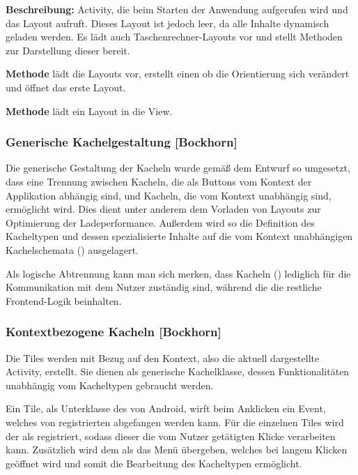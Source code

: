\textbf{Beschreibung:} Activity, die beim Starten der Anwendung aufgerufen wird und das Layout  aufruft. Dieses Layout ist jedoch leer, da alle Inhalte dynamisch geladen werden. Es lädt auch Taschenrechner-Layouts vor und stellt Methoden zur Darstellung dieser bereit.

\textbf{Methode}  lädt die Layouts vor, erstellt einen  ob die Orientierung sich verändert und öffnet das erste Layout.

\textbf{Methode}  lädt ein Layout in die View.

\subsubsection{Generische Kachelgestaltung [Bockhorn]}

Die generische Gestaltung der Kacheln wurde gemäß dem Entwurf so umgesetzt, dass eine Trennung zwischen Kacheln, die als Buttons vom Kontext der Applikation abhängig sind, und Kacheln, die vom Kontext unabhängig sind, ermöglicht wird. Dies dient unter anderem dem Vorladen von Layouts zur Optimierung der Ladeperformance. Außerdem wird so die Definition des Kacheltypen und dessen spezialisierte Inhalte auf die vom Kontext unabhängigen Kachelschemata () ausgelagert. 

Als logische Abtrennung kann man sich merken, dass Kacheln () lediglich für die Kommunikation mit dem Nutzer zuständig sind, während die  die restliche Frontend-Logik beinhalten.

\subsubsection{Kontextbezogene Kacheln [Bockhorn]}

Die Tiles werden mit Bezug auf den Kontext, also die aktuell dargestellte Activity, erstellt. Sie dienen als generische Kachelklasse, dessen Funktionalitäten unabhängig vom Kacheltypen gebraucht werden.

Ein Tile, als Unterklasse des  von Android, wirft beim Anklicken ein Event, welches von registrierten  abgefangen werden kann. Für die einzelnen Tiles wird der  als  registriert, sodass dieser die vom Nutzer getätigten Klicke verarbeiten kann. Zusätzlich wird dem  als  das Menü  übergeben, welches bei langem Klicken geöffnet wird und somit die Bearbeitung des Kacheltypen ermöglicht.

